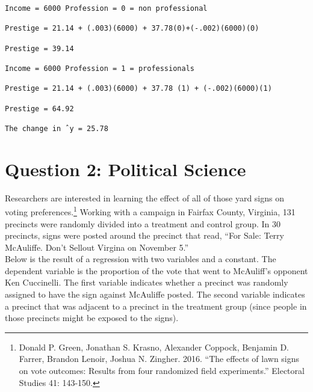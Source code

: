 \documentclass[12pt,letterpaper]{article}
\begin{document}
\begin{enumerate}
\begin{verbatim}
Income = 6000 Profession = 0 = non professional

Prestige = 21.14 + (.003)(6000) + 37.78(0)+(-.002)(6000)(0)

Prestige = 39.14

Income = 6000 Profession = 1 = professionals

Prestige = 21.14 + (.003)(6000) + 37.78 (1) + (-.002)(6000)(1)

Prestige = 64.92

The change in ˆy = 25.78
\end{verbatim}
\end{enumerate}

\newpage

\section*{Question 2: Political Science}
\vspace{.25cm}
\noindent 	Researchers are interested in learning the effect of all of those yard signs on voting preferences.\footnote{Donald P. Green, Jonathan	S. Krasno, Alexander Coppock, Benjamin D. Farrer,	Brandon Lenoir, Joshua N. Zingher. 2016. ``The effects of lawn signs on vote outcomes: Results from four randomized field experiments.'' Electoral Studies 41: 143-150. } Working with a campaign in Fairfax County, Virginia, 131 precincts were randomly divided into a treatment and control group. In 30 precincts, signs were posted around the precinct that read, ``For Sale: Terry McAuliffe. Don't Sellout Virgina on November 5.'' \\

Below is the result of a regression with two variables and a constant.  The dependent variable is the proportion of the vote that went to McAuliff's opponent Ken Cuccinelli. The first variable indicates whether a precinct was randomly assigned to have the sign against McAuliffe posted. The second variable indicates
a precinct that was adjacent to a precinct in the treatment group (since people in those precincts might be exposed to the signs).  \\
\end{document}
